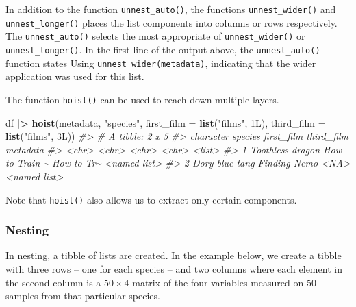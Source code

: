 \documentclass[
]{book}
\newenvironment{Shaded}{\begin{snugshade}}{\end{snugshade}}
\newcommand{\AttributeTok}[1]{\textcolor[rgb]{0.13,0.29,0.53}{#1}}
\newcommand{\CommentTok}[1]{\textcolor[rgb]{0.56,0.35,0.01}{\textit{#1}}}
\newcommand{\DataTypeTok}[1]{\textcolor[rgb]{0.13,0.29,0.53}{#1}}
\newcommand{\DecValTok}[1]{\textcolor[rgb]{0.00,0.00,0.81}{#1}}
\newcommand{\FunctionTok}[1]{\textcolor[rgb]{0.13,0.29,0.53}{\textbf{#1}}}
\newcommand{\NormalTok}[1]{#1}
\newcommand{\SpecialCharTok}[1]{\textcolor[rgb]{0.81,0.36,0.00}{\textbf{#1}}}
\newcommand{\StringTok}[1]{\textcolor[rgb]{0.31,0.60,0.02}{#1}}
\begin{document}
In addition to the function \texttt{unnest\_auto()}, the functions \texttt{unnest\_wider()} and \texttt{unnest\_longer()} places the list components into columns or rows respectively. The \texttt{unnest\_auto()} selects the most appropriate of \texttt{unnest\_wider()} or \texttt{unnest\_longer()}. In the first line of the output above, the \texttt{unnest\_auto()} function states Using \texttt{\textquotesingle{}unnest\_wider(metadata)\textquotesingle{}}, indicating that the wider application was used for this list.

The function \texttt{hoist()} can be used to reach down multiple layers.

\begin{Shaded}
\begin{Highlighting}[]
\NormalTok{df }\SpecialCharTok{|\textgreater{}} \FunctionTok{hoist}\NormalTok{(metadata, }\StringTok{"species"}\NormalTok{, }
            \AttributeTok{first\_film =} \FunctionTok{list}\NormalTok{(}\StringTok{"films"}\NormalTok{, }\DecValTok{1}\DataTypeTok{L}\NormalTok{),                }
            \AttributeTok{third\_film =} \FunctionTok{list}\NormalTok{(}\StringTok{"films"}\NormalTok{, }\DecValTok{3}\DataTypeTok{L}\NormalTok{))}
\CommentTok{\#\textgreater{} \# A tibble: 2 x 5}
\CommentTok{\#\textgreater{}   character species   first\_film     third\_film metadata    }
\CommentTok{\#\textgreater{}   \textless{}chr\textgreater{}     \textless{}chr\textgreater{}     \textless{}chr\textgreater{}          \textless{}chr\textgreater{}      \textless{}list\textgreater{}      }
\CommentTok{\#\textgreater{} 1 Toothless dragon    How to Train \textasciitilde{} How to Tr\textasciitilde{} \textless{}named list\textgreater{}}
\CommentTok{\#\textgreater{} 2 Dory      blue tang Finding Nemo   \textless{}NA\textgreater{}       \textless{}named list\textgreater{}}
\end{Highlighting}
\end{Shaded}

Note that \texttt{hoist()} also allows us to extract only certain components.

\subsubsection{Nesting}\label{nesting}

In nesting, a tibble of lists are created. In the example below, we create a tibble with three rows -- one for each species -- and two columns where each element in the second column is a \(50 \times 4\) matrix of the four variables measured on \(50\) samples from that particular species.
\end{document}

